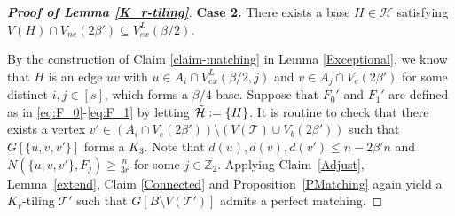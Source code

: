 \documentclass[11pt, a4paper]{article}
\theoremstyle{definition}
\newcommand{\<}{\subseteq}
\begin{document}
\begin{proof}[\bf Proof of Lemma \ref{K_r-tiling}]
\medskip
\textbf{Case 2.} There exists a base $H\in \mathcal{H}$ satisfying  $V(H)\cap V_{ne}(2\beta')\subseteq V_{ex}^L(\beta/2).$
\medskip

By the construction of Claim \ref{claim-matching} in Lemma \ref{Exceptional}, we know that $H$ is an edge $uv$ with $u\in A_i\cap V_{ex}^L(\beta/2,j)$ and $v\in A_j\cap V_e(2\beta')$ for some distinct $i,j\in [s]$, which forms a $\beta/4$-base. %
Suppose that $F_0'$ and $F_1'$ are defined as in \eqref{eq:F_0}-\eqref{eq:F_1} by letting $\Tilde{\mathcal{H}}:=\{H\}$. %
It is routine to check that there exists a vertex $v'\in (A_i\cap V_e(2\beta'))\setminus (V(\mathcal{T})\cup V_b(2\beta'))$ such that $G[\{u,v,v'\}]$ forms a $K_3$. Note that $d(u),d(v),d(v')\le n-2\beta'n$ and $N(\{u,v,v'\},F_j)\ge \frac{n}{3r}$ for some $j\in \mathbb{Z}_2$. %
Applying Claim~\ref{Adjust}, Lemma~\ref{extend}, Claim \ref{Connected} and Proposition~\ref{PMatching} again yield a $K_r$-tiling $\mathcal{T}'$ such that $G[B\setminus V(\mathcal{T}')]$ admits a perfect matching.


\end{proof}
\end{document}
